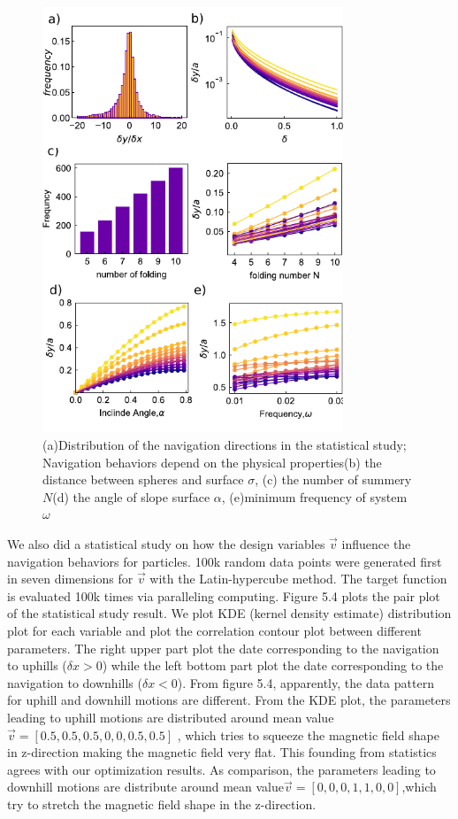 \begin{figure}[p]
\centering
\includegraphics[width=9cm]{figures/5_5.pdf}
\caption{(a)Distribution of the navigation directions in the statistical study; Navigation behaviors depend on the physical properties(b) the distance between spheres and surface $\sigma$, (c) the number of summery $N$(d) the angle of slope surface $\alpha$, (e)minimum frequency of system  $\omega$ }
\label{fig:1}
\end{figure}


We also did a statistical study on how the design variables $\vec{v}$ influence the  navigation behaviors for particles. 100k random data points were generated first in seven dimensions for $\vec{v}$ with the Latin-hypercube method\autocite{park1994optimal}. The target function is evaluated 100k times via paralleling computing. Figure 5.4 plots the pair plot of the statistical study result. We plot KDE (kernel density estimate) distribution plot for each variable and plot the correlation contour plot between different parameters. The right upper part plot the date corresponding to the navigation to uphills ($\delta x>0$) while the left bottom part plot the date corresponding to the navigation to downhills ($\delta x<0$). From figure 5.4, apparently, the data pattern for uphill and downhill motions are different. From the KDE plot, the parameters leading to uphill motions are distributed around mean value$\vec{v}=[0.5,0.5,0.5,0,0,0.5,0.5]$  , which tries to squeeze the magnetic field shape in z-direction making the magnetic field  very flat. This founding from statistics agrees with our optimization results. As comparison, the parameters leading to downhill motions are distribute around mean value$\vec{v}=[0,0,0,1,1,0,0]$,which try to 
stretch the magnetic field shape in the z-direction.
 
